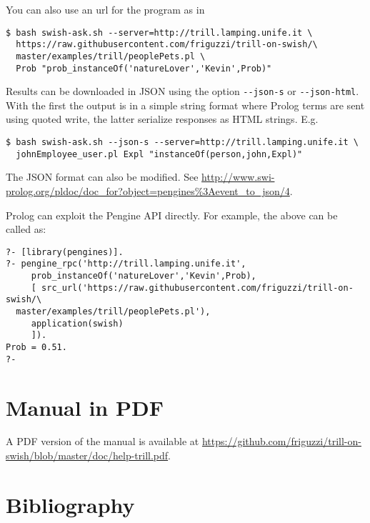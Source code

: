 \documentclass[a4paper,10pt]{scrartcl}
\begin{document}
You can also use an url for the program as in 
\begin{verbatim}
$ bash swish-ask.sh --server=http://trill.lamping.unife.it \
  https://raw.githubusercontent.com/friguzzi/trill-on-swish/\
  master/examples/trill/peoplePets.pl \
  Prob "prob_instanceOf('natureLover','Kevin',Prob)"
\end{verbatim}
Results can be downloaded in JSON using the option \verb|--json-s| or
\verb|--json-html|.
With the first the output is in a simple string format where Prolog terms are sent using quoted write, the latter serialize responses as HTML strings. E.g.
\begin{verbatim}
$ bash swish-ask.sh --json-s --server=http://trill.lamping.unife.it \
  johnEmployee_user.pl Expl "instanceOf(person,john,Expl)"
\end{verbatim}
The JSON format can also be modified. See
\url{http://www.swi-prolog.org/pldoc/doc_for?object=pengines%3Aevent_to_json/4}.

Prolog can exploit the Pengine API directly.  For example, the above can
be called as:
\begin{verbatim}
?- [library(pengines)].
?- pengine_rpc('http://trill.lamping.unife.it',
     prob_instanceOf('natureLover','Kevin',Prob),
     [ src_url('https://raw.githubusercontent.com/friguzzi/trill-on-swish/\
  master/examples/trill/peoplePets.pl'),
     application(swish)
     ]).
Prob = 0.51.
?-
\end{verbatim}

\section{Manual in PDF}
A PDF version of the manual is available at
\url{https://github.com/friguzzi/trill-on-swish/blob/master/doc/help-trill.pdf}.
\section{Bibliography}


\end{document}
